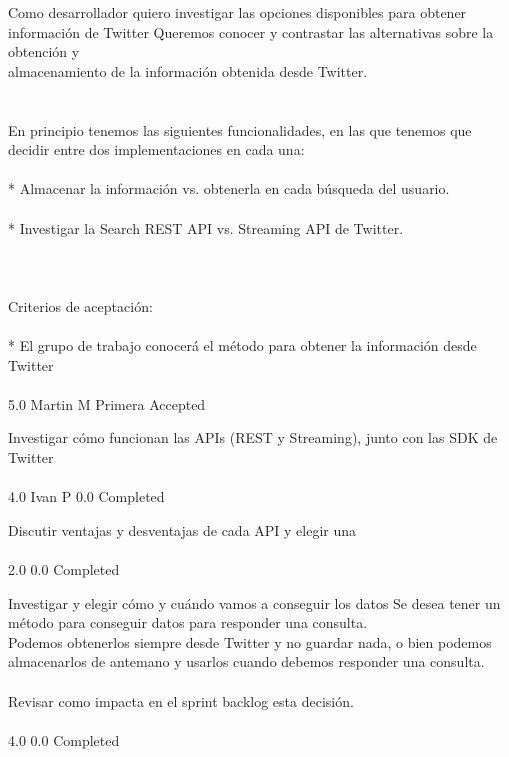 	{Como desarrollador quiero investigar las opciones disponibles para obtener información de Twitter} %
	{Queremos conocer y contrastar las alternativas sobre la obtención y\\
almacenamiento de la información obtenida desde Twitter.\\
\\
  \\
En principio tenemos las siguientes funcionalidades, en las que tenemos que\\
decidir entre dos implementaciones en cada una:\\
\\
* Almacenar la información vs. obtenerla en cada búsqueda del usuario.\\
\\
* Investigar la Search REST API vs. Streaming API de Twitter.\\
\\
  \\
\\
Criterios de aceptación:\\
\\
* El grupo de trabajo conocerá el método para obtener la información desde Twitter  \\
\\
} %
	{} %
	{5.0} %
	{Martin M} %
	{Primera} %
	{Accepted} %

		{Investigar cómo funcionan las APIs (REST y Streaming), junto con las SDK de Twitter} %
		{\\
\\
} %
		{4.0} %
		{Ivan P} %
		{0.0} %
		{Completed} %

		{Discutir ventajas y desventajas de cada API y elegir una} %
		{\\
\\
} %
		{2.0} %
		{} %
		{0.0} %
		{Completed} %

		{Investigar y elegir cómo y cuándo vamos a conseguir los datos} %
		{Se desea tener un método para conseguir datos para responder una consulta.\\
Podemos obtenerlos siempre desde Twitter y no guardar nada, o bien podemos\\
almacenarlos de antemano y usarlos cuando debemos responder una consulta.\\
\\
Revisar como impacta en el sprint backlog esta decisión.\\
\\
} %
		{4.0} %
		{} %
		{0.0} %
		{Completed} %


